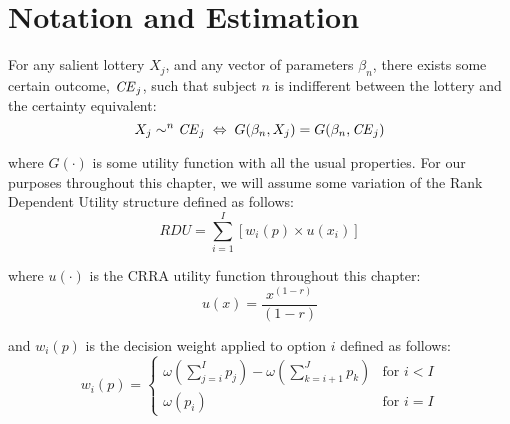\documentclass[../main.tex]{subfiles}
\begin{document}

\section{Notation and Estimation} \label{ssec:Notation}

For any salient lottery $X_j$, and any vector of parameters $\beta_n$, there exists some certain outcome, $\mathit{CE}_j$, such that subject $n$ is indifferent between the lottery and the certainty equivalent:
\begin{equation}
	\label{eq3:CE.indiff}
	X_j \sim^n {\mathit{CE}}_j \;\Leftrightarrow\; G(\beta_n,X_j) = G(\beta_n, {\mathit{CE}}_j)
\end{equation}

\noindent where $G(\cdot)$ is some utility function with all the usual properties.
For our purposes throughout this chapter, we will assume some variation of the Rank Dependent Utility structure defined as follows:
\begin{equation}
	\label{eq3:RDU}
	RDU = \sum_{i=1}^{I} \left[ w_i(p) \times u(x_i) \right]
\end{equation}

\noindent where $u(\cdot)$ is the CRRA utility function throughout this chapter:
\begin{equation}
	\label{eq3:CRRA}
	u(x) = \frac{x^{(1-r)}}{(1-r)}
\end{equation}

\noindent and $w_i(p)$ is the decision weight applied to option $i$ defined as follows:
\begin{equation}
	\label{eq3:dweight}
	w_i(p) =
	\begin{cases}
		\omega\left(\displaystyle\sum_{j=i}^I p_j\right) - \omega\left(\displaystyle\sum_{k=i+1}^J p_k\right) & \text{for } i<I \\
		\omega(p_i) & \text{for } i = I
	\end{cases}
\end{equation}
\end{document}

